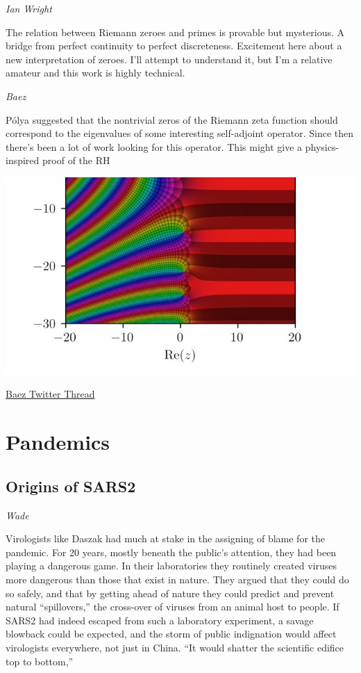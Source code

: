 \documentclass[
]{book}
\begin{document}
\emph{Ian Wright}

The relation between Riemann zeroes and primes is provable but mysterious. A bridge from perfect continuity to perfect discreteness. Excitement here about a new interpretation of zeroes. I'll attempt to understand it, but I'm a relative amateur and this work is highly technical.

\emph{Baez}

Pólya suggested that the nontrivial zeros of the Riemann zeta function should correspond to the eigenvalues of some interesting self-adjoint operator. Since then there's been a lot of work looking for this operator. This might give a physics-inspired proof of the RH

\includegraphics{fig/riemann_zeta.jpeg}

\href{https://twitter.com/johncarlosbaez/status/1404119086062178307}{Baez Twitter Thread}

\hypertarget{pandemics}{%
\chapter{Pandemics}\label{pandemics}}

\hypertarget{origins-of-sars2}{%
\section{Origins of SARS2}\label{origins-of-sars2}}

\emph{Wade}

Virologists like Daszak had much at stake in the assigning of blame for the pandemic. For 20 years, mostly beneath the public's attention, they had been playing a dangerous game. In their laboratories they routinely created viruses more dangerous than those that exist in nature. They argued that they could do so safely, and that by getting ahead of nature they could predict and prevent natural ``spillovers,'' the cross-over of viruses from an animal host to people. If SARS2 had indeed escaped from such a laboratory experiment, a savage blowback could be expected, and the storm of public indignation would affect virologists everywhere, not just in China. ``It would shatter the scientific edifice top to bottom,''
\end{document}
